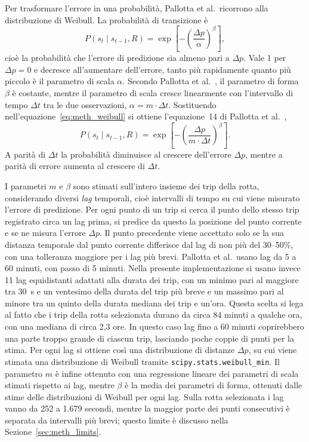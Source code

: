 Per trasformare l'errore in una probabilità, Pallotta et al.\ ricorrono alla distribuzione di Weibull. 
La probabilità di transizione è
\begin{equation}\label{eq:meth_weibull}
    P(s_t \mid s_{t-1}, R) = \exp\!\left[-{\left(\frac{\Delta p}{\alpha}\right)}^{\beta}\right] ,
\end{equation}
cioè la probabilità che l'errore di predizione sia almeno pari a $\Delta p$. Vale 1 per $\Delta p = 0$
e decresce all'aumentare dell'errore, tanto più rapidamente quanto più piccolo è il parametro di scala
$\alpha$. Secondo Pallotta et al.~\cite{pallotta}, il parametro di forma $\beta$ è costante, mentre il parametro di scala cresce
linearmente con l'intervallo di tempo $\Delta t$ tra le due osservazioni, $\alpha = m \cdot \Delta t$. Sostituendo
nell'equazione~\eqref{eq:meth_weibull} si ottiene l'equazione~14 di Pallotta et al.~\cite{pallotta},
\[
    P(s_t \mid s_{t-1}, R) = \exp\!\left[-{\left(\frac{\Delta p}{m \cdot \Delta t}\right)}^{\beta}\right] .
\]
A parità di $\Delta t$ la probabilità diminuisce al crescere dell'errore $\Delta p$, mentre a parità di
errore aumenta al crescere di $\Delta t$.

I parametri $m$ e $\beta$ sono stimati sull'intero insieme dei trip della rotta, considerando diversi
\emph{lag} temporali, cioè intervalli di tempo su cui viene misurato l'errore di predizione. Per ogni
punto di un trip si cerca il punto dello stesso trip registrato circa un lag prima, si predice da questo
la posizione del punto corrente e se ne misura l'errore $\Delta p$. Il punto precedente viene accettato
solo se la sua distanza temporale dal punto corrente differisce dal lag di non più del 30--50\%, con
una tolleranza maggiore per i lag più brevi. Pallotta et al.\ usano lag da 5 a 60 minuti, con passo
di 5 minuti. Nella presente implementazione si usano invece 11 lag equidistanti adattati alla durata
dei trip, con un minimo pari al maggiore tra 30~s e un ventesimo della durata del trip più breve e un
massimo pari al minore tra un quinto della durata mediana dei trip e un'ora.
Questa scelta si lega al fatto che i trip della rotta selezionata durano da circa 84 minuti a qualche ora, con una mediana di circa
2,3 ore. In questo caso lag fino a 60 minuti coprirebbero una parte troppo grande di ciascun trip, lasciando poche
coppie di punti per la stima.
Per ogni lag si ottiene così una distribuzione di distanze $\Delta p$, su cui viene stimata una
distribuzione di Weibull tramite \texttt{scipy.stats.weibull\_min}. Il parametro $m$ è infine ottenuto
con una regressione lineare dei parametri di scala stimati rispetto ai lag, mentre $\beta$ è la media
dei parametri di forma, ottenuti dalle stime delle distribuzioni di Weibull per ogni lag. 
Sulla rotta selezionata i lag vanno da 252 a 1.679 secondi, mentre la maggior
parte dei punti consecutivi è separata da intervalli più brevi; questo limite è discusso nella
Sezione~\ref{sec:meth_limits}.

